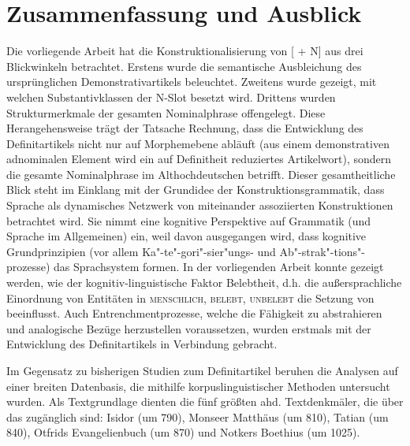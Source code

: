 \chapter{Zusammenfassung und Ausblick}\label{kapitel:zusammenfassung}

Die vorliegende Arbeit hat die Konstruktionalisierung von [ + N] aus drei Blickwinkeln betrachtet. Erstens wurde die semantische Ausbleichung des ursprünglichen Demonstrativartikels beleuchtet. Zweitens wurde gezeigt, mit welchen Substantivklassen der N-Slot besetzt wird. Drittens wurden Strukturmerkmale der gesamten Nominalphrase offengelegt. 
Diese Herangehensweise trägt der Tatsache Rechnung, dass die Entwicklung des Definitartikels nicht nur auf Morphemebene abläuft (aus einem demonstrativen adnominalen Element wird ein auf Definitheit reduziertes Artikelwort), sondern die gesamte Nominalphrase im Althochdeutschen betrifft. Dieser gesamtheitliche Blick steht im Einklang mit der Grundidee der Konstruktionsgrammatik, dass Sprache als dynamisches Netzwerk von miteinander assoziierten Konstruktionen betrachtet wird. Sie nimmt eine kognitive Perspektive auf Grammatik (und Sprache im Allgemeinen) ein, weil davon ausgegangen wird, dass kognitive Grundprinzipien (vor allem Ka"-te"-gori"-sier"ungs- und Ab"-strak"-tions"-prozesse) das Sprachsystem formen. In der vorliegenden Arbeit konnte gezeigt werden, wie der kognitiv-linguistische Faktor Belebtheit, d.h. die außersprachliche Einordnung von Entitäten in \textsc{menschlich, belebt, unbelebt} die Setzung von  beeinflusst. Auch Entrenchmentprozesse, welche die Fähigkeit zu abstrahieren und analogische Bezüge herzustellen voraussetzen, wurden erstmals mit der Entwicklung des Definitartikels in Verbindung gebracht.

Im Gegensatz zu bisherigen Studien zum Definitartikel beruhen die Analysen auf einer breiten Datenbasis, die mithilfe korpuslinguistischer Methoden untersucht wurden. Als Textgrundlage dienten die fünf größten ahd. Textdenkmäler, die über das  zugänglich sind: Isidor (um 790), Monseer Matthäus (um 810), Tatian (um 840), Otfrids Evangelienbuch (um 870) und Notkers Boethius (um 1025). 

